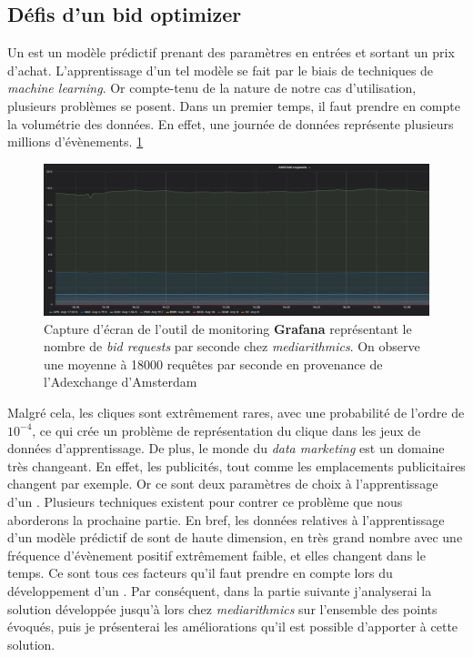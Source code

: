     \subsection{Défis d'un bid optimizer}
        Un \bo est un modèle prédictif prenant des paramètres en entrées et sortant un prix d'achat. L'apprentissage d'un tel modèle se fait par le biais de techniques de \emph{machine learning}. Or compte-tenu de la nature de notre cas d'utilisation, plusieurs problèmes se posent. Dans un premier temps, il faut prendre en compte la volumétrie des données. En effet, une journée de données représente plusieurs millions d'évènements. \ref{fig:bid-requests-nb}
        \begin{figure}[ht]
            \includegraphics[width=\linewidth]{images/bidrequests.png}
            \caption{Capture d'écran de l'outil de monitoring \textbf{Grafana} représentant le nombre de \emph{bid requests} par seconde chez \emph{mediarithmics}. On observe une moyenne à 18000 requêtes par seconde en provenance de l'Adexchange d'Amsterdam}
            \label{fig:bid-requests-nb}
        \end{figure}
        Malgré cela, les cliques sont extrêmement rares, avec une probabilité de l'ordre de $10^{-4}$, ce qui crée un problème de représentation du clique dans les jeux de données d'apprentissage. De plus, le monde du \emph{data marketing} est un domaine très changeant. En effet, les publicités, tout comme les emplacements publicitaires changent par exemple. Or ce sont deux paramètres de choix à l'apprentissage d'un \bo. Plusieurs techniques existent pour contrer ce problème que nous aborderons la prochaine partie. En bref, les données relatives à l'apprentissage d'un modèle prédictif de \bo sont de haute dimension, en  très grand nombre avec une fréquence d'évènement positif extrêmement faible, et elles changent dans le temps. Ce sont tous ces facteurs qu'il faut prendre en compte lors du développement d'un \bo. Par conséquent, dans la partie suivante j'analyserai la solution développée jusqu'à lors chez \emph{mediarithmics} sur l'ensemble des points évoqués, puis je présenterai les améliorations qu'il est possible d'apporter à cette solution.
